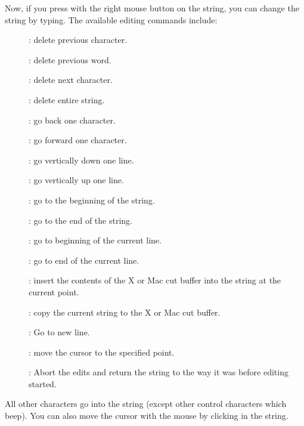 Now, if you press with the right mouse button on the string, you can change
the string by typing.  The available editing commands include:
\begin{description}
\item[] : delete previous character.

\item[] : delete previous word.

\item[] : delete next character.

\item[] : delete entire string.

\item[] : go back one character.

\item[] : go forward one character.

\item[] : go vertically down one line.

\item[] : go vertically up one line.

\item[] : go to the beginning of the string.

\item[] : go to the end of the string.

\item[] : go to beginning of the current line.

\item[] : go to end of the current line.

\item[] : insert the contents of the X or Mac cut buffer into
the string at the current point.

\item[] : copy the current string to the X or Mac cut buffer.

\item[] : Go to new line.

\item[] : move the cursor to the
specified point.

\item[] : Abort the edits and return the string to the way it was before
editing started.
\end{description}
All other characters go into the string (except other control characters
which beep).  You can also move the cursor with the mouse by clicking in
the string.

